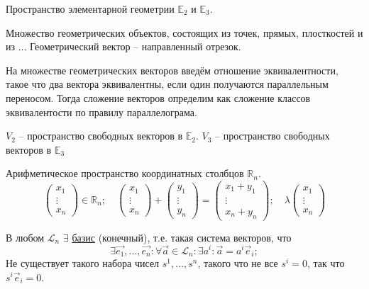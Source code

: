 \begin{ex}
  Пространство элементарной геометрии $\mathbb{E}_2$ и $\mathbb{E}_3$.

  Множество геометрических объектов, состоящих из точек, прямых, плосткостей и из ... Геометрический
  вектор -- направленный отрезок.

  На множестве геометрических векторов введём отношение эквивалентности, такое что два вектора
  эквивалентны, если один получаются параллельным переносом. Тогда сложение векторов определим
  как сложение классов эквивалентости по правилу параллелограма. 

  $V_2$ -- пространство свободных векторов в $\mathbb E_2$.
  $V_3$ -- пространство свободных векторов в $\mathbb E_3$
\end{ex}

\begin{ex}
  Арифметическое пространство координатных столбцов $\mathbb{R}_n$.
  \[
    \begin{pmatrix}
      x_1 \\
      \vdots \\
      x_n
    \end{pmatrix} \in \mathbb{R}_n; \quad
    \begin{pmatrix}
      x_1 \\
      \vdots \\
      x_n
    \end{pmatrix} + \begin{pmatrix}
      y_1 \\
      \vdots \\
      y_n
    \end{pmatrix} = 
    \begin{pmatrix}
      x_1 + y_1 \\
      \vdots \\
      x_n + y_n
    \end{pmatrix}; \quad
    \lambda \begin{pmatrix}
      x_1 \\
      \vdots \\
      x_n
    \end{pmatrix} 
  \]
\end{ex}

В любом $\mathcal{L}_n$ $\exists$ \underline{базис} (конечный), т.е. такая система векторов, что
\[
  \exists \vec{e_1}, \dots, \vec{e_n}: \forall \vec{a} \in \mathcal L_n: \exists a^i :  \vec{a} = a^i \vec{e}_i;
\]
Не существует такого набора чисел $s^1, \dots, s^n$, такого что не все $s^i = 0$, так что
$s^i \vec{e}_i = 0$.

